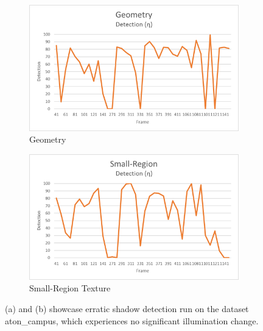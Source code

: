 \begin{figure}
\centering
\begin{subfigure}{.8\linewidth}
  \includegraphics[width=1\linewidth]{figures/campus_geo_erratic.jpg}
  \caption{Geometry}
\end{subfigure}
\hfill
\begin{subfigure}{.8\linewidth}
  \includegraphics[width=1\linewidth]{figures/campus_srt_erratic.jpg}
  \caption{Small-Region Texture}
\end{subfigure}

\caption{(a) and (b) showcase erratic shadow detection run on the dataset aton\_campus, which experiences no significant illumination change.}
\label{fig:geosrterratic}
\end{figure}

